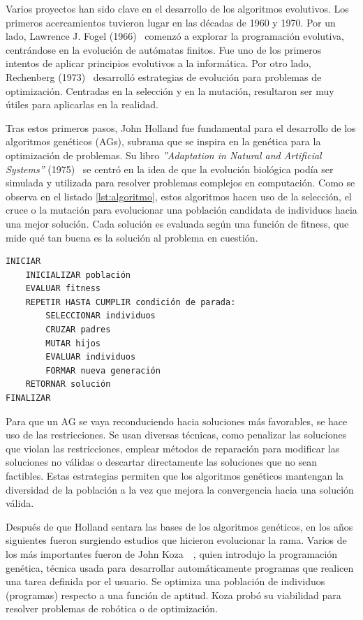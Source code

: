 Varios proyectos han sido clave en el desarrollo de los algoritmos evolutivos. Los primeros acercamientos tuvieron lugar en las décadas de 1960 y 1970. Por un lado, Lawrence J. Fogel (1966)~\cite{fogel1966} comenzó a explorar la programación evolutiva, centrándose en la evolución de autómatas finitos. Fue uno de los primeros intentos de aplicar principios evolutivos a la informática. Por otro lado, Rechenberg (1973)~\cite{rechenberg1973} desarrolló estrategias de evolución para problemas de optimización. Centradas en la selección y en la mutación, resultaron ser muy útiles para aplicarlas en la realidad.

Tras estos primeros pasos, John Holland fue fundamental para el desarrollo de los algoritmos genéticos (AGs), subrama que se inspira en la genética para la optimización de problemas. Su libro \textit{''Adaptation in Natural and Artificial Systems''} (1975)~\cite{holland1975} se centró en la idea de que la evolución biológica podía ser simulada y utilizada para resolver problemas complejos en computación. Como se observa en el listado \ref{lst:algoritmo}, estos algoritmos hacen uso de la selección, el cruce o la mutación para evolucionar una población candidata de individuos hacia una mejor solución. Cada solución es evaluada según una función de fitness, que mide qué tan buena es la solución al problema en cuestión.
\newpage
\begin{lstlisting}[caption=Algoritmo evolutivo., label={lst:algoritmo}]
INICIAR
    INICIALIZAR población
    EVALUAR fitness
    REPETIR HASTA CUMPLIR condición de parada:
        SELECCIONAR individuos
        CRUZAR padres
        MUTAR hijos
        EVALUAR individuos
        FORMAR nueva generación
    RETORNAR solución
FINALIZAR
\end{lstlisting}

Para que un AG se vaya reconduciendo hacia soluciones más favorables, se hace uso de las restricciones. Se usan diversas técnicas, como penalizar las soluciones que violan las restricciones, emplear métodos de reparación para modificar las soluciones no válidas o descartar directamente las soluciones que no sean factibles. Estas estrategias permiten que los algoritmos genéticos mantengan la diversidad de la población a la vez que mejora la convergencia hacia una solución válida.

Después de que Holland sentara las bases de los algoritmos genéticos, en los años siguientes fueron surgiendo estudios que hicieron evolucionar la rama. Varios de los más importantes fueron de John Koza~\cite{koza1992}~\cite{koza1994}, quien introdujo la programación genética, técnica usada para desarrollar automáticamente programas que realicen una tarea definida por el usuario. Se optimiza una población de individuos (programas) respecto a una función de aptitud. Koza probó su viabilidad para resolver problemas de robótica o de optimización.

